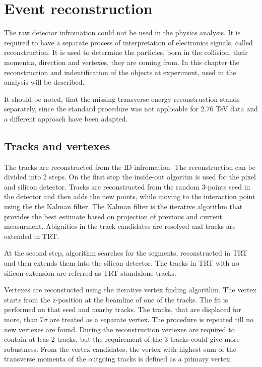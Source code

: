 \chapter{Event reconstruction}\label{chap:Rec}
\minitoc
The raw detector infromation could not be used in the physics analysis. It is required to have a separate process of interpretation of electronics signals, called reconstruction. It is used to determine the particles, born in the collision, their momentia, direction and vertexes, they are coming from. In this chapter the reconstruction and indentification of the objects at \atlas experiment, used in the analysis will be described. 

It should be noted, that the missing transverse energy reconstruction stands separately, since the standard procedure was not applicable for 2.76 TeV data and a different approach have been adapted.

\section{Tracks and vertexes}
The tracks are reconstructed from the ID infromation. The reconstruction can be divided into 2 steps. 
On the first step the inside-out algoritm is used for the pixel and silicon detector. Tracks are reconstructed from the random 3-points seed in the detector and then adds the new points, while moving to the interaction point using the the Kalman filter.  The Kalman filter is the iterative algorithm that provides the best estimate based on projection of previous and current measurment.  Abiguities in the track candidates are resolved and tracks are extended in TRT.

At the second step, algorithm searches for the segments, reconstructed in TRT and then extends them into the silicon detector. The tracks in TRT with no silicon extension are referred as TRT-standalone tracks. 

Vertexes are reconstucted using the iterative vertex finding algorithm. The vertex starts from the z-position at the beamline of one of the tracks. The \chiD fit is performed on that seed and nearby tracks. The tracks, that are displaced for more, than 7$\sigma$ are treated as a separate vertex. The procedure is repeated till no new vertexes are found. During the reconstruction vertexes are required to contain at leas 2 tracks, but the requirement of the 3 tracks could give more robustness. From the vertex candidates, the vertex with highest sum of the transverse momenta of the outgoing tracks is defined as a primary vertex.

